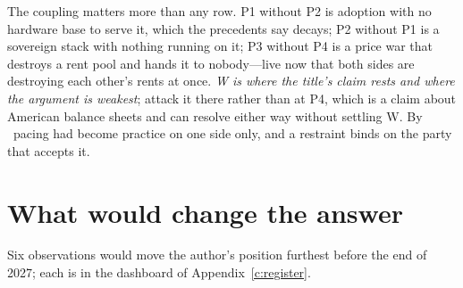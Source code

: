 The coupling matters more than any row. P1 without P2 is adoption with no hardware base to serve it, which the precedents say decays; P2 without P1 is a sovereign stack with nothing running on it; P3 without P4 is a price war that destroys a rent pool and hands it to nobody---live now that both sides are destroying each other's rents at once. \emph{W is where the title's claim rests and where the argument is weakest}; attack it there rather than at P4, which is a claim about American balance sheets and can resolve either way without settling W. By \datafreeze\ pacing had become practice on one side only, and a restraint binds on the party that accepts it.

\section{What would change the answer}

Six observations would move the author's position furthest before the end of 2027; each is in the dashboard of Appendix~\ref{c:register}.

